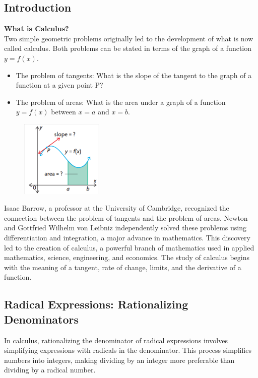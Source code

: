 \documentclass{article}
\begin{document}
\vspace{2cm}



\maketitle

\tableofcontents
\newpage



\subsection{Introduction}
\textbf{What is Calculus?}\\
Two simple geometric problems originally led to the development of what is now called calculus. Both problems can be stated in terms of the graph of a function $y=f(x)$.
\begin{itemize}
    \item The problem of tangents: What is the slope of the tangent to the graph of a function at a given point P?
    \item The problem of areas: What is the area under a graph of a function $y=f(x)$ between $x=a$ and $x=b$.
\end{itemize}
    \begin{figure}[ht]
    \centering
    \includegraphics[width=0.35\textwidth]{imgs/Chapter 1 - MCV4U Nelson.png}
    \end{figure}
Isaac Barrow, a professor at the University of Cambridge, recognized the connection between the problem of tangents and the problem of areas. Newton and Gottfried Wilhelm von Leibniz independently solved these problems using differentiation and integration, a major advance in mathematics. This discovery led to the creation of calculus, a powerful branch of mathematics used in applied mathematics, science, engineering, and economics. The study of calculus begins with the meaning of a tangent, rate of change, limits, and the derivative of a function.
\newpage

\subsection*{Radical Expressions: Rationalizing Denominators}
In calculus, rationalizing the denominator of radical expressions involves simplifying expressions with radicals in the denominator. This process simplifies numbers into integers, making dividing by an integer more preferable than dividing by a radical number. \\ 
\end{document}
